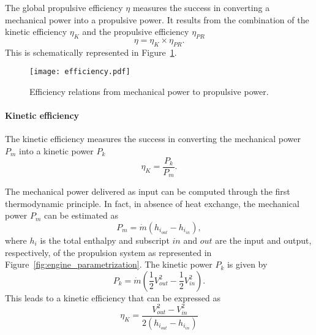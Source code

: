 The global propulsive efficiency $\eta$ measures the 
success in converting a mechanical power into a
propulsive power. It results from the combination
of the kinetic efficiency $\eta_{K}$ and the propulsive efficiency
$\eta_{PR}$
\begin{equation}
	\eta = \eta_{K} \times \eta_{PR}.
\end{equation}
This is schematically represented in Figure~\ref{fig:cror_efficiency}.
\begin{figure}[htp]
  \centering
  \texttt{[image: efficiency.pdf]}
  \caption{Efficiency relations from mechanical power to propulsive power.}
  \label{fig:cror_efficiency}
\end{figure}

\paragraph{Kinetic efficiency}
The kinetic efficiency measures the success in converting the mechanical
power $P_m$ into a kinetic power $P_k$
\begin{equation}
	\eta_K = \frac{P_k}{P_m}.
\end{equation}

The mechanical power delivered as input
can be computed through the first thermodynamic principle. In fact, in absence
of heat exchange, the mechanical power $P_m$ can be estimated as
\begin{equation}
	P_m = \dot{m} (h_{i_{out}} - h_{i_{in}}),
\end{equation}
where $h_i$ is the total enthalpy and subscript $in$ and $out$ are
the input and output, respectively, of the propulsion system as represented
in Figure~\ref{fig:engine_parametrization}.
The kinetic power $P_k$ is given by
\begin{equation}
	P_k = \dot{m} \left(\frac{1}{2} V^2_{out} -
	\frac{1}{2} V^2_{in} \right).
\end{equation}
This leads to a kinetic efficiency that can be expressed as
\begin{equation}
	\eta_{K} = \frac{V^2_{out} - V^2_{in}}{2 (h_{i_{out}} - h_{i_{in}})}
\end{equation}

